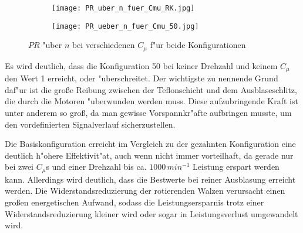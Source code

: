 \begin{figure}[h]
	\centering
	\begin{subfigure}[c]{0.45\textwidth}		
		\texttt{[image: PR\_uber\_n\_fuer\_Cmu\_RK.jpg]}
		\label{fig:PR RK}
	\end{subfigure}
	\begin{subfigure}[c]{0.45\textwidth}
		\texttt{[image: PR\_ueber\_n\_fuer\_Cmu\_50.jpg]}
		\label{fig:PR 50}
	\end{subfigure}
		\caption{$PR$ "uber $n$ bei verschiedenen $C_{\mu}$ f"ur beide Konfigurationen}
	\label{fig:PR}
\end{figure}

Es wird deutlich, dass die Konfiguration 50 bei keiner Drehzahl und keinem $C_{\mu}$ den Wert 1 erreicht, oder "uberschreitet. Der wichtigste zu nennende Grund daf"ur ist die gro\ss{}e Reibung zwischen der Teflonschicht und dem Ausblaseschlitz, die durch die Motoren "uberwunden werden muss. Diese aufzubringende Kraft ist unter anderem so gro\ss{}, da man gewisse Vorspannkr"afte aufbringen musste, um den vordefinierten Signalverlauf sicherzustellen.

Die Basiskonfiguration erreicht im Vergleich zu der gezahnten Konfiguration eine deutlich h"ohere Effektivit"at, auch wenn nicht immer vorteilhaft, da gerade nur bei zwei $C_{\mu}$s und einer Drehzahl bis ca. $1000$\,$min^{-1}$ Leistung erspart werden kann. Allerdings wird deutlich, dass die Bestwerte bei reiner Ausblasung erreicht werden. Die Widerstandsreduzierung der rotierenden Walzen verursacht einen gro\ss{}en energetischen Aufwand, sodass die Leistungsersparnis trotz einer Widerstandsreduzierung kleiner wird oder sogar in Leistungsverlust umgewandelt wird.